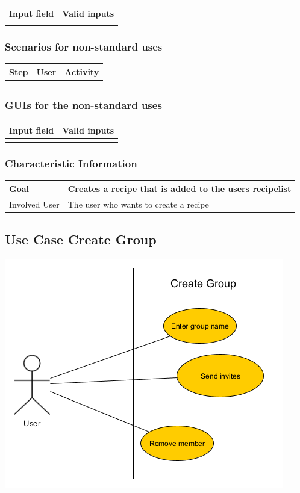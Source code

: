 \documentclass[12pt]{article}
\theoremstyle{definition}
\begin{document}
\begin{tabular}{|l|l|}
\hline
Input field & Valid inputs \\ \hline
 &  \\ \hline
\end{tabular}

\subsubsection{Scenarios for non-standard uses}

\begin{tabular}{|l|l|l|}
\hline
Step & User & Activity \\ \hline
 & & \\ \hline
\end{tabular}

\subsubsection{GUIs for the non-standard uses}

\begin{tabular}{|l|l|}
\hline
Input field & Valid inputs \\ \hline
 &  \\ \hline
\end{tabular}


\subsubsection{Characteristic Information}

\begin{tabular}{|l|l|}
\hline
Goal & Creates a recipe that is added to the users recipelist  \\ \hline
Involved User & The user who wants to create a recipe \\ \hline
\end{tabular}

\subsection{Use Case Create Group}

\includegraphics[scale=.5]{UseCaseCreateGroup.png}\\
\end{document}
